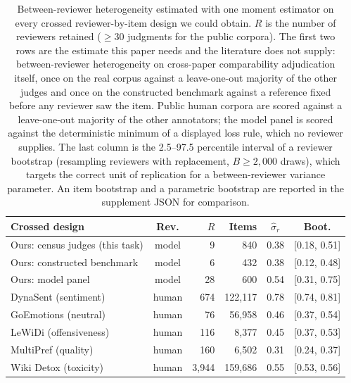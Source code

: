 \begin{table}[t]
\centering\scriptsize
\setlength{\tabcolsep}{2.5pt}
\begin{tabular}{@{}lcrrcc@{}}
\toprule
Crossed design & Rev. & $R$ & Items & $\hat\sigma_r$ & Boot. \\
\midrule
Ours: census judges (this task) & model & 9 & 840 & 0.38 & [0.18, 0.51] \\
Ours: constructed benchmark & model & 6 & 432 & 0.38 & [0.12, 0.48] \\
Ours: model panel & model & 28 & 600 & 0.54 & [0.31, 0.75] \\
DynaSent (sentiment) & human & 674 & 122,117 & 0.78 & [0.74, 0.81] \\
GoEmotions (neutral) & human & 76 & 56,958 & 0.46 & [0.37, 0.54] \\
LeWiDi (offensiveness) & human & 116 & 8,377 & 0.45 & [0.37, 0.53] \\
MultiPref (quality) & human & 160 & 6,502 & 0.31 & [0.24, 0.37] \\
Wiki Detox (toxicity) & human & 3,944 & 159,686 & 0.55 & [0.53, 0.56] \\
\bottomrule
\end{tabular}
\caption{Between-reviewer heterogeneity estimated with one moment estimator on every crossed reviewer-by-item design we could obtain. $R$ is the number of reviewers retained ($\geq 30$ judgments for the public corpora). The first two rows are the estimate this paper needs and the literature does not supply: between-reviewer heterogeneity on cross-paper comparability adjudication itself, once on the real corpus against a leave-one-out majority of the other judges and once on the constructed benchmark against a reference fixed before any reviewer saw the item. Public human corpora are scored against a leave-one-out majority of the other annotators; the model panel is scored against the deterministic minimum of a displayed loss rule, which no reviewer supplies. The last column is the 2.5--97.5 percentile interval of a reviewer bootstrap (resampling reviewers with replacement, $B \geq 2{,}000$ draws), which targets the correct unit of replication for a between-reviewer variance parameter. An item bootstrap and a parametric bootstrap are reported in the supplement JSON for comparison.}
\label{tab:sigma-r-anchors}
\end{table}
